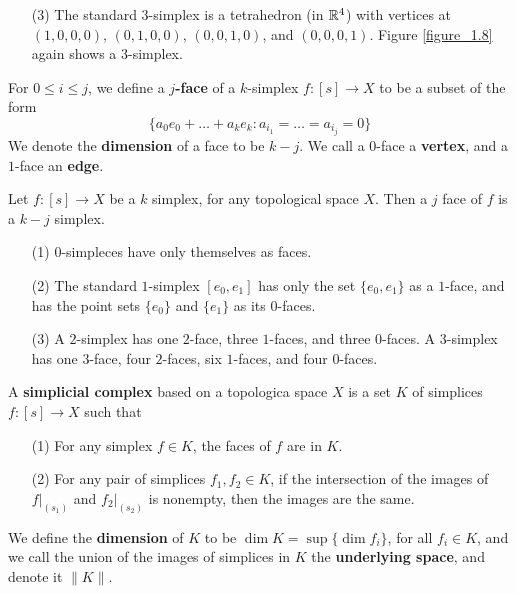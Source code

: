 \begin{example}
\begin{enumerate}
        \item[(3)] The standard $3$-simplex is a tetrahedron  (in $\mathbb{R}^4$) with
            vertices at $(1,0,0,0)$, $(0,1,0,0)$, $(0,0,1,0)$, and $(0,0,0,1)$.
            Figure \ref{figure_1.8} again shows a $3$-simplex.
    \end{enumerate}
\end{example}

\begin{definition}
    For $0 \leq i \leq j$, we define a \textbf{$j$-face} of a $k$-simplex
     $f:[s] \xrightarrow{} X$ to be a subset of the form
     \begin{equation*}
         \{a_0e_0+\dots+a_ke_k : a_{i_1}=\dots=a_{i_j}=0\}
     \end{equation*}
     We denote the \textbf{dimension} of a face to be  $k-j$. We call a
     $0$-face a  \textbf{vertex}, and a $1$-face an  \textbf{edge}.
\end{definition}

\begin{lemma}\label{1.4.1}
    Let $f:[s] \xrightarrow{} X$ be a $k$ simplex, for any topological space
    $X$. Then a  $j$ face of $f$ is a $k-j$ simplex.
\end{lemma}

\begin{example}\label{example_1.13}
    \begin{enumerate}
        \item[(1)] $0$-simpleces have only themselves as faces.

        \item[(2)] The standard $1$-simplex  $[e_0,e_1]$ has only the set
            $\{e_0,e_1\}$ as a $1$-face, and has the point sets  $\{e_0\}$
            and $\{e_1\}$ as its $0$-faces.

        \item[(3)] A $2$-simplex has one  $2$-face, three $1$-faces, and three
            $0$-faces. A $3$-simplex has one $3$-face, four $2$-faces, six
            $1$-faces, and four $0$-faces.
    \end{enumerate}
\end{example}

\begin{definition}
    A \textbf{simplicial complex} based on a topologica space $X$ is a set  $K$
    of simplices  $f:[s] \xrightarrow{} X$ such that
    \begin{enumerate}
        \item[(1)] For any simplex $f \in K$, the faces of $f$ are in  $K$.

        \item[(2)] For any pair of simplices $f_1, f_2 \in K$, if the
            intersection of the images of $f|_{(s_1)}$ and $f_2|_{(s_2)}$ is
            nonempty, then the images are the same.
    \end{enumerate}
    We define the \textbf{dimension} of $K$ to be  $\dim{K}=\sup\{\dim{f_i}\}$,
    for all $f_i \in K$, and we call the union of the images of simplices in
    $K$ the  \textbf{underlying space}, and denote it $\|K\|$.
\end{definition}

